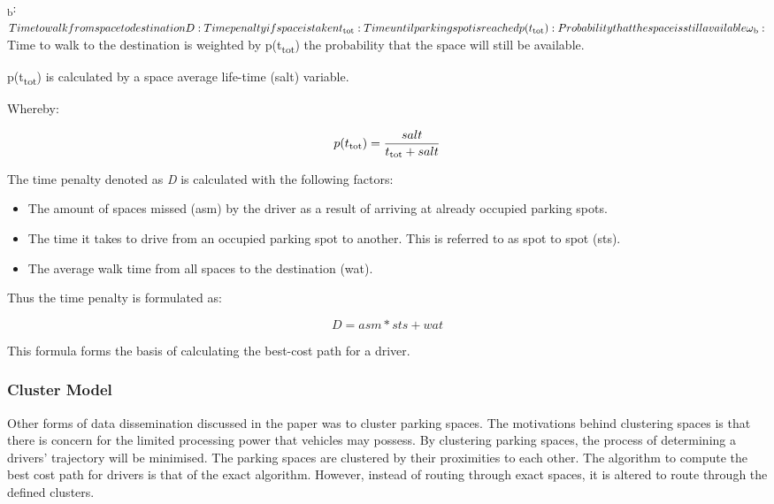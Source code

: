 \omega\textsubscript{b}: $ Time to walk from space to destination

D: Time penalty if space is taken

t\textsubscript{tot}: Time until parking spot is reached

p(t\textsubscript{tot}): Probability that the space is still available

\omega\textsubscript{b}: $ Time to walk to the destination is weighted by p(t\textsubscript{tot}) the probability that the space will still be available.

p(t\textsubscript{tot}) is calculated by a space average life-time (salt) variable. 

Whereby: 

\[ p(t\textsubscript{tot}) = \frac{salt}{t\textsubscript{tot} + salt} \]

The time penalty denoted as \textit{D} is calculated with the following factors:
\begin{itemize}
    \item The amount of spaces missed (asm) by the driver as a result of arriving at already occupied parking spots.
    \item The time it takes to drive from an occupied parking spot to another. This is referred to as spot to spot  (sts).
    \item The average walk time from all spaces to the destination (wat).
\end{itemize}

Thus the time penalty is formulated as:

\[ D = asm * sts + wat \]

This formula forms the basis of calculating the best-cost path for a driver.

\subsubsection{Cluster Model}\label{sssec:cluster}
Other forms of data dissemination discussed in the paper \citep{Verroios2011ReachingNetworking} was to cluster parking spaces. The motivations behind clustering spaces is that there is concern for the limited processing power that vehicles may possess. By clustering parking spaces, the process of determining a drivers' trajectory will be minimised. The parking spaces are clustered by their proximities to each other. The algorithm to compute the best cost path for drivers is that of the exact algorithm. However, instead of routing through exact spaces, it is altered to route through the defined clusters.

